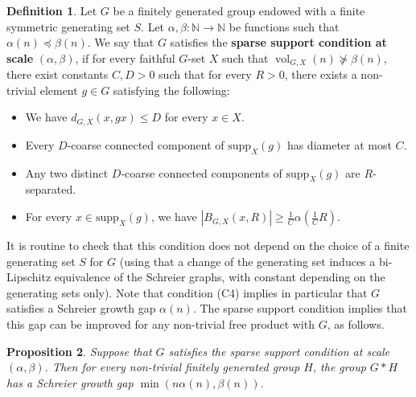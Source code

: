 \documentclass[11pt]{amsart}
\newcommand{\vol}{\ensuremath{\operatorname{vol}}}%
\newcommand{\supp}{\ensuremath{\textrm{supp}}}%
\theoremstyle{definition}
\newtheorem{defin}{Definition}[section]
\theoremstyle{plain}
\newtheorem{prop}[defin]{Proposition}
\theoremstyle{remark}
\begin{document}
\begin{defin}
\label{def:C}
Let $G$ be a finitely generated group endowed with a finite symmetric generating set $S$. Let $\alpha, \beta \colon \mathbb{N} \to \mathbb{N}$ be functions such that $\alpha(n) \preccurlyeq \beta(n)$. We say that $G$ satisfies the\textbf{ sparse support condition at scale} $(\alpha, \beta)$,  if  for every faithful $G$-set $X$ such that $\vol_{G, X}(n)\not \succcurlyeq \beta(n)$, there exist constants $C, D>0$ such that for every $R>0$, there exists a non-trivial element $g\in G$ satisfying the following:
\begin{itemize}
\item[(C1)] We have $d_{G, X}(x, gx)\le D$ for every $x\in X$. 
\item[(C2)] Every $D$-coarse connected component of $\supp_X(g)$ has diameter at most $C$. 
\item[(C3)] Any two distinct $D$-coarse connected components of $\supp_X(g)$ are $R$-separated.
\item[(C4)] For every $x\in \supp_X(g)$, we have $|B_{G,X}(x, R)|\ge \frac{1}{C} \alpha(\frac{1}{C}R)$. 
\end{itemize}
\end{defin}
It is routine to check that this condition does not depend on the choice of a finite generating set $S$ for $G$ (using that a change of the generating set induces a bi-Lipschitz equivalence of the Schreier graphs, with constant depending on the generating sets only). Note that condition (C4) implies in particular that $G$ satisfies a Schreier growth gap $\alpha(n)$. The sparse support condition implies that this gap can be improved for any non-trivial free product with $G$, as follows. 
\begin{prop}\label{p-sparse-support}
Suppose that $G$ satisfies the sparse support condition at scale $(\alpha, \beta)$. Then for every non-trivial finitely generated group $H$, the group $G\ast H$ has a Schreier growth gap $\min(n \alpha(n), \beta(n))$.

\end{prop}
\end{document}
